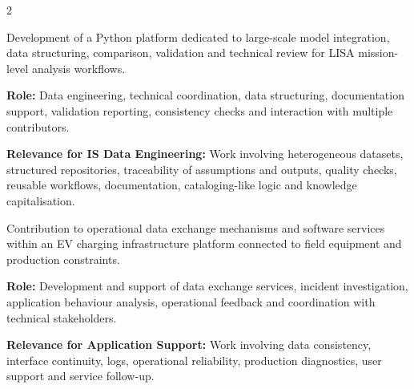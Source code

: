 \documentclass[8pt,a4paper,ragged2e,withhyper]{altacv}
\begin{document}
\begin{paracol}{2}
\divider


\divider




\end{paracol}



Development of a Python platform dedicated to large-scale model integration, data structuring, comparison, validation and technical review for LISA mission-level analysis workflows.

\textbf{Role:} Data engineering, technical coordination, data structuring, documentation support, validation reporting, consistency checks and interaction with multiple contributors.

\textbf{Relevance for IS Data Engineering:} Work involving heterogeneous datasets, structured repositories, traceability of assumptions and outputs, quality checks, reusable workflows, documentation, cataloging-like logic and knowledge capitalisation.

\divider


Contribution to operational data exchange mechanisms and software services within an EV charging infrastructure platform connected to field equipment and production constraints.

\textbf{Role:} Development and support of data exchange services, incident investigation, application behaviour analysis, operational feedback and coordination with technical stakeholders.

\textbf{Relevance for Application Support:} Work involving data consistency, interface continuity, logs, operational reliability, production diagnostics, user support and service follow-up.
\end{document}
